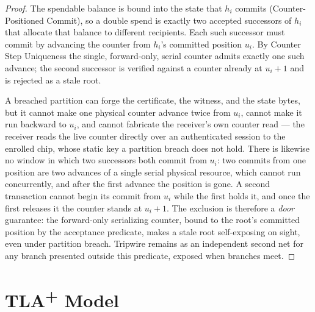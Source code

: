 \documentclass[11pt]{article}
\theoremstyle{definition}
\theoremstyle{remark}
\begin{document}
\begin{proof}
The spendable balance is bound into the state that \(h_i\) commits (Counter-Positioned Commit), so a
double spend is exactly two accepted successors of \(h_i\) that allocate that balance to different
recipients. Each such successor must commit by advancing the counter from \(h_i\)'s committed position
\(u_i\). By Counter Step Uniqueness the single, forward-only, serial counter admits exactly one such
advance; the second successor is verified against a counter already at \(u_i+1\) and is rejected as a
stale root.

A breached partition can forge the certificate, the witness, and the state bytes, but it cannot make
one physical counter advance twice from \(u_i\), cannot make it run backward to \(u_i\), and cannot
fabricate the receiver's own counter read --- the receiver reads the live counter directly over an
authenticated session to the enrolled chip, whose static key a partition breach does not hold. There is
likewise no window in which two successors both commit from \(u_i\): two commits from one position are
two advances of a single serial physical resource, which cannot run concurrently, and after the first
advance the position is gone. A second transaction cannot begin its commit from \(u_i\) while the first
holds it, and once the first releases it the counter stands at \(u_i+1\). The exclusion is therefore a
\emph{door} guarantee: the forward-only serializing counter, bound to the root's committed position by
the acceptance predicate, makes a stale root self-exposing on sight, even under partition breach. Tripwire
remains as an independent second net for any branch presented outside this predicate, exposed when
branches meet.
\end{proof}

\section{TLA\texorpdfstring{\textsuperscript{+}}{+} Model}
\end{document}
